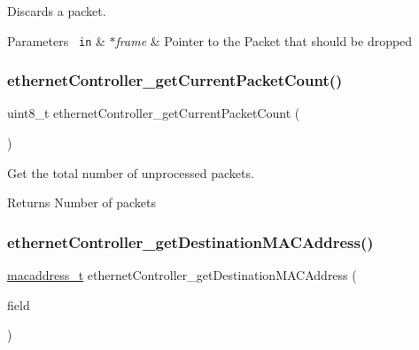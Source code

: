 Discards a packet. 


\begin{DoxyParams}[1]{Parameters}
\mbox{\texttt{ in}}  & {\em $\ast$frame} & Pointer to the Packet that should be dropped \\
\hline
\end{DoxyParams}
\mbox{\label{group__data__reception_ga0ab2398cb48efd9a8943a5c5b2872b0c}} 
\subsubsection{\texorpdfstring{ethernetController\_getCurrentPacketCount()}{ethernetController\_getCurrentPacketCount()}}
{\footnotesize\ttfamily uint8\+\_\+t ethernet\+Controller\+\_\+get\+Current\+Packet\+Count (\begin{DoxyParamCaption}{ }\end{DoxyParamCaption})}



Get the total number of unprocessed packets. 

\begin{DoxyReturn}{Returns}
Number of packets 
\end{DoxyReturn}
\mbox{\label{group__data__reception_ga29e5c29891e62206ceed99a6b15749a0}} 
\subsubsection{\texorpdfstring{ethernetController\_getDestinationMACAddress()}{ethernetController\_getDestinationMACAddress()}}
{\footnotesize\ttfamily \mbox{\hyperlink{group__ethernet_gacb865bcbf50a6c8cef05581bfabff373}{macaddress\+\_\+t}} ethernet\+Controller\+\_\+get\+Destination\+M\+A\+C\+Address (\begin{DoxyParamCaption}\item[{\mbox{\hyperlink{group__memory_ga1d04d80fae40964f55d2df46b5d64785}{memory\+Field\+\_\+t}}}]{field }\end{DoxyParamCaption})}



